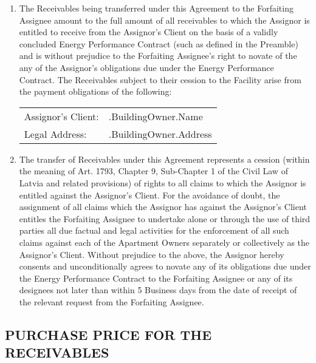 \documentclass[a4paper]{article}
\begin{document}
\begin{enumerate}
\item{The Receivables being transferred under this Agreement to the
    Forfaiting Assignee amount to the full amount of all receivables
    to which the Assignor is entitled to receive from the Assignor’s
    Client on the basis of a validly concluded Energy Performance
    Contract (such as defined in the Preamble) and is without
    prejudice to the Forfaiting Assignee’s right to novate of the any
    of the Assignor’s obligations due under the Energy Performance
    Contract. The Receivables subject to their cession to the Facility
    arise from the payment obligations of the following: \par

    \begin{tabu}{XX[2]}
      Assignor’s Client:  & {{.BuildingOwner.Name}} \\
      Legal Address:      & {{.BuildingOwner.Address}}
    \end{tabu}}

\item{The transfer of Receivables under this Agreement represents a
    cession (within the meaning of Art. 1793, Chapter 9, Sub{-}Chapter
    1 of the Civil Law of Latvia and related provisions) of rights to
    all claims to which the Assignor is entitled against the
    Assignor’s Client. For the avoidance of doubt, the assignment of
    all claims which the Assignor has against the Assignor’s Client
    entitles the Forfaiting Assignee to undertake alone or through the
    use of third parties all due factual and legal activities for the
    enforcement of all such claims against each of the Apartment
    Owners separately or collectively as the Assignor’s
    Client. Without prejudice to the above, the Assignor hereby
    consents and unconditionally agrees to novate any of its
    obligations due under the Energy Performance Contract to the
    Forfaiting Assignee or any of its designees not later than within
    5 Business days from the date of receipt of the relevant request
    from the Forfaiting Assignee. }
\end{enumerate}

\subsection{PURCHASE PRICE FOR THE RECEIVABLES}
\end{document}
